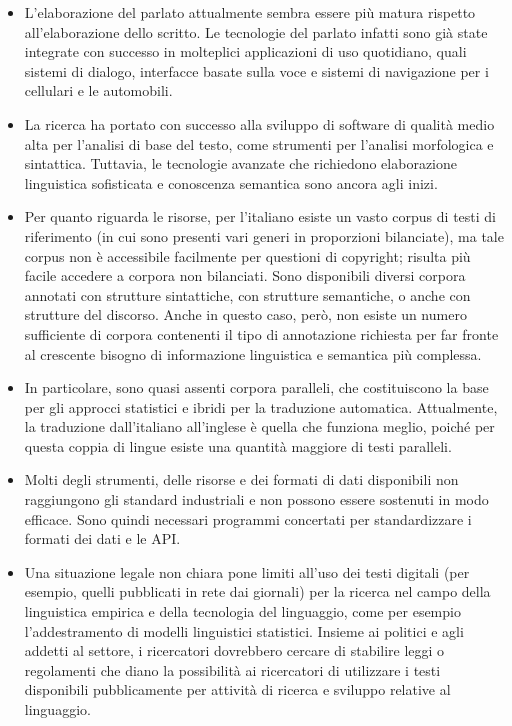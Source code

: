 \begin{multicols}{2}
\begin{itemize}
\item  L'elaborazione del parlato attualmente sembra essere pi\`{u} matura rispetto all'elaborazione dello scritto. Le tecnologie del parlato infatti sono gi\`{a} state integrate con successo in molteplici applicazioni di uso quotidiano, quali sistemi di dialogo, interfacce basate sulla voce e sistemi di navigazione per i cellulari e le automobili.
\item La ricerca ha portato con successo alla sviluppo di software di qualit\`{a} medio alta per l'analisi di base del testo, come strumenti per l'analisi morfologica e sintattica. Tuttavia, le tecnologie avanzate che richiedono elaborazione linguistica sofisticata e conoscenza semantica sono ancora agli inizi.
\item Per quanto riguarda le risorse, per l'italiano esiste un vasto corpus di testi di riferimento (in cui sono presenti vari generi in proporzioni bilanciate), ma tale corpus non \`{e} accessibile facilmente per questioni di copyright; risulta pi\`{u} facile accedere a corpora non bilanciati. Sono disponibili diversi corpora annotati con strutture sintattiche, con strutture semantiche, o anche con strutture del discorso. Anche in questo caso, per\`{o}, non esiste un numero sufficiente di corpora contenenti il tipo di annotazione richiesta per far fronte al crescente bisogno di informazione linguistica e semantica   pi\`{u} complessa.
\item In particolare, sono quasi assenti corpora paralleli, che costituiscono la base per gli approcci statistici e ibridi per la traduzione automatica. Attualmente, la traduzione dall'italiano all'inglese \`{e} quella che funziona meglio, poich\'{e} per questa coppia di lingue esiste una quantit\`{a} maggiore di testi paralleli.
\item Molti degli strumenti, delle risorse e dei formati di dati disponibili non raggiungono gli standard industriali e non possono essere sostenuti in modo efficace. Sono quindi necessari programmi concertati per standardizzare i formati dei dati e le API.
\item Una situazione legale non chiara pone limiti all'uso dei testi digitali (per esempio, quelli pubblicati in rete dai giornali) per la ricerca nel campo della  linguistica empirica e della tecnologia del linguaggio, come per esempio l'addestramento di modelli linguistici statistici. Insieme ai politici e agli addetti al settore, i ricercatori dovrebbero cercare di stabilire leggi o regolamenti che diano la possibilit\`{a} ai ricercatori di utilizzare i testi disponibili pubblicamente per attivit\`{a} di ricerca e sviluppo relative al linguaggio.

\end{itemize}
\end{multicols}
